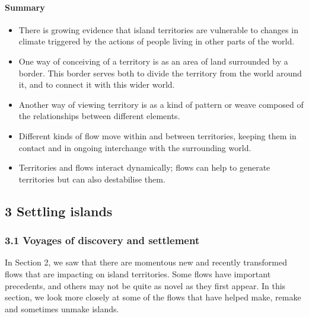 \documentclass[letterpaper,10pt,english]{sphinxmanual}
\begin{document}
\paragraph{Summary}
\label{\detokenize{content/session_00/Part_00_02:Summary}}\begin{itemize}
\item {} 
There is growing evidence that island territories are vulnerable to changes in climate triggered by the actions of people living in other parts of the world.

\item {} 
One way of conceiving of a territory is as an area of land surrounded by a border. This border serves both to divide the territory from the world around it, and to connect it with this wider world.

\item {} 
Another way of viewing territory is as a kind of pattern or weave composed of the relationships between different elements.

\item {} 
Different kinds of flow move within and between territories, keeping them in contact and in ongoing interchange with the surrounding world.

\item {} 
Territories and flows interact dynamically; flows can help to generate territories but can also destabilise them.

\end{itemize}


\subsection{3 Settling islands}
\label{\detokenize{content/session_00/Part_00_03:3-Settling-islands}}\label{\detokenize{content/session_00/Part_00_03::doc}}

\subsubsection{3.1 Voyages of discovery and settlement}
\label{\detokenize{content/session_00/Part_00_03:3.1-Voyages-of-discovery-and-settlement}}
In Section 2, we saw that there are momentous new and recently transformed flows that are impacting on island territories. Some flows have important precedents, and others may not be quite as novel as they first appear. In this section, we look more closely at some of the flows that have helped make, remake and sometimes unmake islands.
\end{document}

